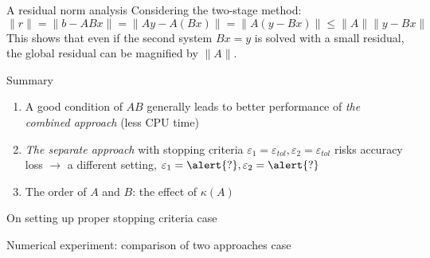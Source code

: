\documentclass[aspectratio=169]{beamer}
\begin{document}
\begin{frame}{A residual norm analysis}
	Considering the two-stage method:
	\begin{equation}
		\|r\| = \|b - ABx\| = \|Ay - A(Bx)\| = \|A(y - Bx)\| \le \|A\| \|y - Bx\|
	\end{equation}
	This shows that even if the second system $Bx=y$ is solved with a small residual, the global residual can be magnified by $\|A\|$.
\end{frame}

\begin{frame}{Summary}
	\begin{enumerate}
		\item A good condition of $AB$ generally leads to better performance of \textit{the combined approach} (less CPU time)
		\item \textit{The separate approach} with stopping criteria $\varepsilon_{1} = \varepsilon_{tol}, \varepsilon_{2} = \varepsilon_{tol}$ risks accuracy loss $\rightarrow$ a different setting, $\varepsilon_{1} = \alert{?}, \varepsilon_{2} = \alert{?}$
		\item The order of $A$ and  $B$: the effect of $\kappa(A)$
	\end{enumerate}
\end{frame}
\begin{frame}{On setting up proper stopping criteria}
	case	
\end{frame}

\begin{frame}{Numerical experiment: comparison of two approaches}
	case
\end{frame}
\end{document}
